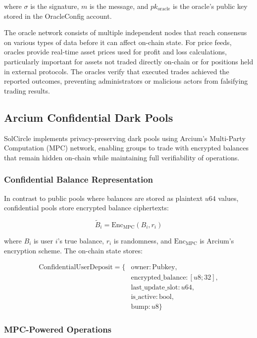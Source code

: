 \documentclass[11pt,a4paper]{article}
\begin{document}
where $\sigma$ is the signature, $m$ is the message, and $pk_{\text{oracle}}$ is the oracle's public key stored in the OracleConfig account.

The oracle network consists of multiple independent nodes that reach consensus on various types of data before it can affect on-chain state. For price feeds, oracles provide real-time asset prices used for profit and loss calculations, particularly important for assets not traded directly on-chain or for positions held in external protocols. The oracles verify that executed trades achieved the reported outcomes, preventing administrators or malicious actors from falsifying trading results.

\subsection{Arcium Confidential Dark Pools}

SolCircle implements privacy-preserving dark pools using Arcium's Multi-Party Computation (MPC) network, enabling groups to trade with encrypted balances that remain hidden on-chain while maintaining full verifiability of operations.

\subsubsection{Confidential Balance Representation}

In contrast to public pools where balances are stored as plaintext $u64$ values, confidential pools store encrypted balance ciphertexts:

\begin{equation}
\widetilde{B}_i = \text{Enc}_{\text{MPC}}(B_i, r_i)
\end{equation}

where $B_i$ is user $i$'s true balance, $r_i$ is randomness, and $\text{Enc}_{\text{MPC}}$ is Arcium's encryption scheme. The on-chain state stores:

\begin{align}
\text{ConfidentialUserDeposit} = \{ &\text{owner}: \text{Pubkey}, \\
&\text{encrypted\_balance}: [u8; 32], \\
&\text{last\_update\_slot}: u64, \\
&\text{is\_active}: \text{bool}, \\
&\text{bump}: u8 \}
\end{align}

\subsubsection{MPC-Powered Operations}
\end{document}
